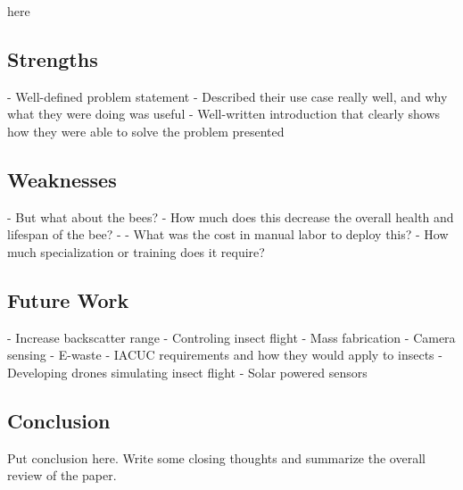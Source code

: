 here\documentclass[letterpaper,twocolumn,10pt]{article}
\begin{document}
\subsection*{Strengths}

- Well-defined problem statement
    - Described their use case really well, and why what they were doing was useful
- Well-written introduction that clearly shows how they were able to solve the problem presented

\subsection*{Weaknesses}

- But what about the bees?
    - How much does this decrease the overall health and lifespan of the bee?
- 
- What was the cost in manual labor to deploy this?
    - How much specialization or training does it require?

\subsection*{Future Work}

- Increase backscatter range
- Controling insect flight
- Mass fabrication
- Camera sensing
- E-waste
- IACUC requirements and how they would apply to insects
- Developing drones simulating insect flight
- Solar powered sensors

\subsection*{Conclusion}

Put conclusion here. Write some closing thoughts and summarize the overall review of the paper.
\end{document}
